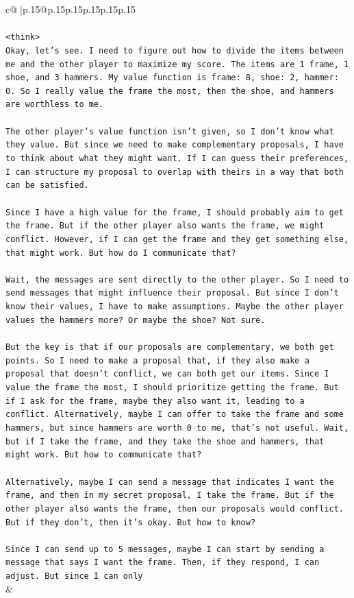 \documentclass{article}
\begin{document}
{\begin{supertabular}{c@{$\;$}|p{.15\linewidth}@{}p{.15\linewidth}p{.15\linewidth}p{.15\linewidth}p{.15\linewidth}p{.15\linewidth}}
{{{\\ 
\\ 
\texttt{<think>} \\
\texttt{Okay, let's see. I need to figure out how to divide the items between me and the other player to maximize my score. The items are 1 frame, 1 shoe, and 3 hammers. My value function is frame: 8, shoe: 2, hammer: 0. So I really value the frame the most, then the shoe, and hammers are worthless to me. } \\
\\ 
\texttt{The other player's value function isn't given, so I don't know what they value. But since we need to make complementary proposals, I have to think about what they might want. If I can guess their preferences, I can structure my proposal to overlap with theirs in a way that both can be satisfied.} \\
\\ 
\texttt{Since I have a high value for the frame, I should probably aim to get the frame. But if the other player also wants the frame, we might conflict. However, if I can get the frame and they get something else, that might work. But how do I communicate that?} \\
\\ 
\texttt{Wait, the messages are sent directly to the other player. So I need to send messages that might influence their proposal. But since I don't know their values, I have to make assumptions. Maybe the other player values the hammers more? Or maybe the shoe? Not sure.} \\
\\ 
\texttt{But the key is that if our proposals are complementary, we both get points. So I need to make a proposal that, if they also make a proposal that doesn't conflict, we can both get our items. Since I value the frame the most, I should prioritize getting the frame. But if I ask for the frame, maybe they also want it, leading to a conflict. Alternatively, maybe I can offer to take the frame and some hammers, but since hammers are worth 0 to me, that's not useful. Wait, but if I take the frame, and they take the shoe and hammers, that might work. But how to communicate that?} \\
\\ 
\texttt{Alternatively, maybe I can send a message that indicates I want the frame, and then in my secret proposal, I take the frame. But if the other player also wants the frame, then our proposals would conflict. But if they don't, then it's okay. But how to know?} \\
\\ 
\texttt{Since I can send up to 5 messages, maybe I can start by sending a message that says I want the frame. Then, if they respond, I can adjust. But since I can only} \\
            }
        }
    }
    & \\ \\


\end{supertabular}}
\end{document}
